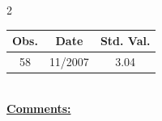 
\bigskip 
\begin{multicols}{2}{ 
\begin{tabular}{ccc}
\hline  Obs.  &  Date &  Std. Val. \\ 
\hline 
                       58 &       11/2007 &          3.04 \vspace{-.12in} \\  
 \end{tabular} 
\\ 
 \columnbreak 
 \singlespacing 
 \underline{\textbf{Comments:}} \\ 
 \bigskip       

 } 
\end{multicols} 

